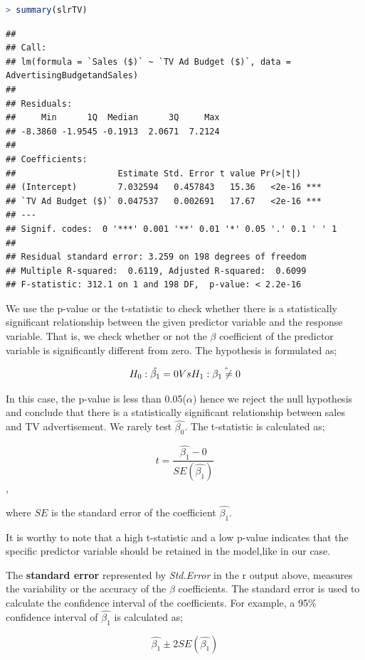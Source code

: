 \documentclass[
]{article}
\begin{document}
\begin{lstlisting}[language=R]
> summary(slrTV)
\end{lstlisting}

\begin{lstlisting}
## 
## Call:
## lm(formula = `Sales ($)` ~ `TV Ad Budget ($)`, data = AdvertisingBudgetandSales)
## 
## Residuals:
##     Min      1Q  Median      3Q     Max 
## -8.3860 -1.9545 -0.1913  2.0671  7.2124 
## 
## Coefficients:
##                    Estimate Std. Error t value Pr(>|t|)    
## (Intercept)        7.032594   0.457843   15.36   <2e-16 ***
## `TV Ad Budget ($)` 0.047537   0.002691   17.67   <2e-16 ***
## ---
## Signif. codes:  0 '***' 0.001 '**' 0.01 '*' 0.05 '.' 0.1 ' ' 1
## 
## Residual standard error: 3.259 on 198 degrees of freedom
## Multiple R-squared:  0.6119, Adjusted R-squared:  0.6099 
## F-statistic: 312.1 on 1 and 198 DF,  p-value: < 2.2e-16
\end{lstlisting}

We use the p-value or the t-statistic to check whether there is a
statistically significant relationship between the given predictor
variable and the response variable. That is, we check whether or not the
\(\beta\) coefficient of the predictor variable is significantly
different from zero. The hypothesis is formulated as;

\[H_0:\hat{\beta_1}=0\space\space Vs\space\space \space H_1:\hat{\beta_1\neq 0}\]

In this case, the p-value is less than 0.05(\(\alpha\)) hence we reject
the null hypothesis and conclude that there is a statistically
significant relationship between sales and TV advertisement. We rarely
test \(\hat{\beta_0}\). The t-statistic is calculated as;

\[t=\frac{\hat{\beta_1}-0}{SE(\hat{\beta_1})}\],

where \(SE\) is the standard error of the coefficient \(\hat{\beta_1}\).

It is worthy to note that a high t-statistic and a low p-value indicates
that the specific predictor variable should be retained in the
model,like in our case.

The \textbf{standard error} represented by \emph{Std.Error} in the r
output above, measures the variability or the accuracy of the \(\beta\)
coefficients. The standard error is used to calculate the confidence
interval of the coefficients. For example, a 95\% confidence interval of
\(\hat{\beta_1}\) is calculated as;

\[\hat{\beta_1}\pm2SE(\hat{\beta_1})\]
\end{document}
